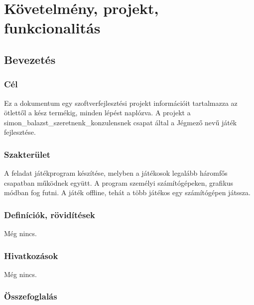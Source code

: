 %
\chapter{Követelmény, projekt, funkcionalitás}

\thispagestyle{fancy}

\section{Bevezetés}

\subsection{Cél}

Ez a dokumentum egy szoftverfejlesztési projekt információit tartalmazza az ötlettől a kész termékig, minden lépést naplózva. A projekt a simon\_balazst\_szeretnenk\_konzulensnek csapat által a Jégmező nevű játék fejlesztése.

\subsection{Szakterület}

A feladat játékprogram készítése, melyben a játékosok legalább háromfős csapatban működnek együtt. A program személyi számítógépeken, grafikus módban fog futni. A játék offline, tehát a több játékos egy számítógépen játssza. 

\subsection{Definíciók, rövidítések}
Még nincs.

\subsection{Hivatkozások}
Még nincs.

\subsection{Összefoglalás}

